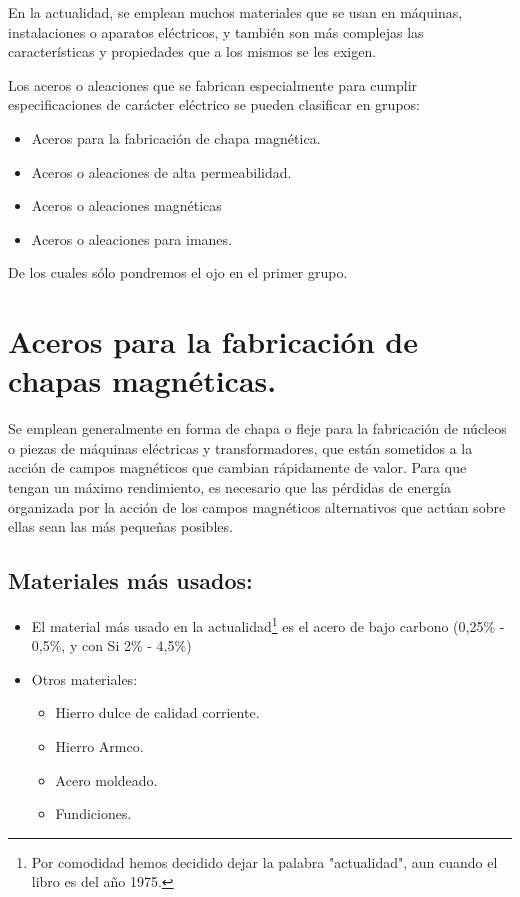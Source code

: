 \documentclass[12pt,a4paper]{article}
\begin{document}
En la actualidad, se emplean muchos materiales que se usan en máquinas, instalaciones o aparatos eléctricos, y también son más complejas las características y propiedades que a los mismos se les exigen.

Los aceros o aleaciones que se fabrican especialmente para cumplir especificaciones de carácter eléctrico se pueden clasificar en grupos:

\begin{itemize}
    \item Aceros para la fabricación de chapa magnética.
    \item Aceros o aleaciones de alta permeabilidad.
    \item Aceros o aleaciones magnéticas
    \item Aceros o aleaciones para imanes.
\end{itemize}

De los cuales sólo pondremos el ojo en el primer grupo.

\section{Aceros para la fabricación de chapas magnéticas.}

Se emplean generalmente en forma de chapa o fleje para la fabricación de núcleos o piezas de máquinas eléctricas y transformadores, que están sometidos a la acción de campos magnéticos que cambian rápidamente de valor. Para que tengan un máximo rendimiento, es necesario que las pérdidas de energía organizada por la acción de los campos magnéticos alternativos que actúan sobre ellas sean las más pequeñas posibles.

\subsection{Materiales más usados:}
\begin{itemize}
    \item El material más usado en la actualidad\footnote{Por comodidad hemos decidido dejar la palabra "actualidad", aun cuando el libro es del año 1975.} es el acero de bajo carbono (0,25\% - 0,5\%, y con Si 2\% - 4,5\%)
    \item Otros materiales: 
    \begin{itemize}
        \item Hierro dulce de calidad corriente.
        \item Hierro Armco.
        \item Acero moldeado.
        \item Fundiciones.
    \end{itemize}
\end{itemize}
\end{document}
